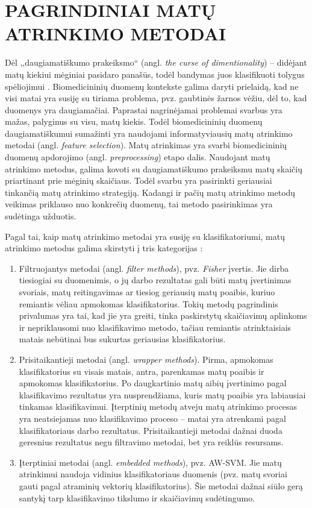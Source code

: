 \section{PAGRINDINIAI MATŲ ATRINKIMO METODAI}
\label{pagrindiniai_matu_atrinkimo_motodai}

Dėl ,,daugiamatiškumo prakeiksmo`` (angl. \textit{the curse of dimentionality}) -- didėjant matų kiekiui mėginiai pasidaro panašūs, todėl bandymas juos klasifikuoti tolygus spėliojimui \cite{bellman1966adaptive}. Biomedicininių duomenų kontekste galima daryti prielaidą, kad ne visi matai yra susiję su tiriama problema, pvz. gaubtinės žarnos vėžiu, dėl to, kad duomenys yra daugiamačiai. Paprastai nagrinėjamai problemai svarbus yra mažas, palyginus su visu, matų kiekis. Todėl biomedicininių duomenų daugiamatiškumui sumažinti yra naudojami informatyviausių matų atrinkimo metodai \cite{guyon2003introduction} (angl. \textit{feature selection}). Matų atrinkimas yra svarbi biomedicininių duomenų apdorojimo (angl. \textit{preprocessing}) etapo dalis. Naudojant matų atrinkimo metodus, galima kovoti su daugiamatiškumo prakeiksmu matų skaičių priartinant prie mėginių skaičiaus. Todėl svarbu yra pasirinkti geriausiai tinkančią matų atrinkimo strategiją. Kadangi ir pačių matų atrinkimo metodų veikimas priklauso nuo 
konkrečių duomenų, tai metodo pasirinkimas yra sudėtinga užduotis.

Pagal tai, kaip matų atrinkimo metodai yra susiję su klasifikatoriumi, matų atrinkimo metodus galima skirstyti į tris kategorijas \cite{saeys2008robust}:
\begin{enumerate}
 \item Filtruojantys metodai (angl. \textit{filter methods}), pvz. \textit{Fisher} įvertis. Jie dirba tiesiogiai su duomenimis, o jų darbo rezultatas gali būti matų įvertinimas svoriais, matų reitingavimas ar tiesiog geriausių matų poaibis, kuriuo remiantis vėliau apmokomas klasifikatorius. Tokių metodų pagrindinis privalumas yra tai, kad jie yra greiti, tinka paskirstytų skaičiavimų aplinkoms ir nepriklausomi nuo klasifikavimo  metodo, tačiau remiantis atrinktaisiais matais nebūtinai bus sukurtas geriausias klasifikatorius.
 \item Prisitaikantieji metodai (angl. \textit{wrapper methods}). Pirma, apmokomas klasifikatorius su visais matais, antra, parenkamas matų poaibis ir apmokomas klasifikatorius. Po daugkartinio matų aibių įvertinimo pagal klasifikavimo rezultatus yra nusprendžiama, kuris matų poaibis yra labiausiai tinkamas klasifikavimui. Įterptinių metodų atveju matų atrinkimo procesas yra neatsiejamas nuo klasifikavimo proceso -- matai yra atrenkami pagal klasifikatoriaus darbo rezultatus. Prisitaikantieji metodai dažnai duoda geresnius rezultatus negu filtravimo metodai, bet yra reiklūs resursams.
 \item Įterptiniai metodai (angl. \textit{embedded methods}), pvz. AW-SVM\cite{vapnik2000nature}. Jie matų atrinkimui naudoja vidinius klasifikatoriaus duomenis (pvz. matų svoriai gauti pagal atraminių vektorių klasifikatorius). Šie metodai dažnai siūlo gerą santykį tarp klasifikavimo tikslumo ir skaičiavimų sudėtingumo.
\end{enumerate}

